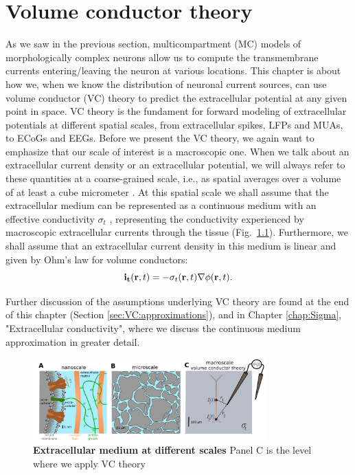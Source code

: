 \chapter{Volume conductor theory}
\label{chap:VC} %
As we saw in the previous section, multicompartment (MC) models of morphologically complex neurons allow us to compute the transmembrane currents entering/leaving the neuron at various locations. This chapter is about how we, when we know the distribution of neuronal current sources, can use volume conductor (VC) theory to predict the extracellular potential at any given point in space. VC theory is the fundament for forward modeling of extracellular potentials at different spatial scales, from extracellular spikes, LFPs and MUAs, to ECoGs and EEGs.
Before we present the VC theory, we again want to emphasize that our scale of interest is a macroscopic one. When we talk about an extracellular current density or an extracellular potential, we will always refer to these quantities at a coarse-grained scale, i.e., as spatial averages over a volume of at least a cube micrometer	. At this spatial scale we shall assume that the extracellular medium can be represented as a continuous medium  with an effective conductivity $\sigma_t$  , representing the conductivity experienced by macroscopic extracellular currents through the tissue (Fig.~\ref{VC:fig:ECS_scales_3levels}). Furthermore, we shall assume that an extracellular current density in this medium is linear and given by Ohm's law for volume conductors:
\begin{equation}
{\bf i_t}({\bf r}, t) = - \sigma_t({\bf r}, t) \nabla \phi({\bf r}, t).
\label{VC:eq:ohmici}
\end{equation}

Further discussion of the assumptions underlying VC theory are found at the end of this chapter (Section \ref{sec:VC:approximations}), and in Chapter \ref{chap:Sigma}, "Extracellular conductivity", where we discuss the continuous medium approximation in greater detail.

\begin{figure}[!ht]
\begin{center}
\includegraphics[width=0.8\textwidth]{Figures/VC/ecs_scales_three_levels.png}
\end{center}
\caption{\textbf{Extracellular medium at different scales}
Panel C is the level where we apply VC theory
}
\label{VC:fig:ECS_scales_3levels}
\end{figure}

